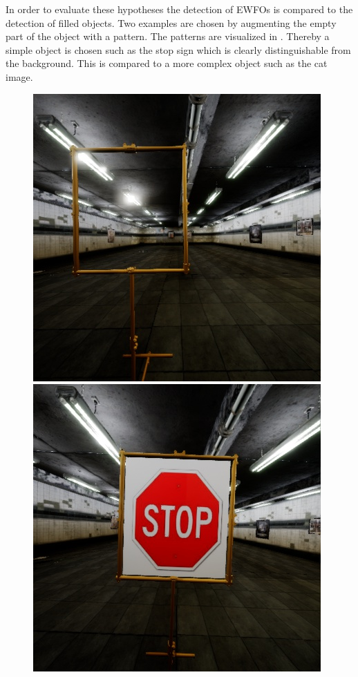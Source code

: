 In order to evaluate these hypotheses the detection of \acp{EWFO} is compared to the detection of filled objects. Two examples are chosen by augmenting the empty part of the object with a pattern. The patterns are visualized in . Thereby a simple object is chosen such as the stop sign which is clearly distinguishable from the background. This is compared to a more complex object such as the cat image.

\begin{figure}[hbtp]
	\centering
	\begin{minipage}{0.3\textwidth}
		\includegraphics[width=\textwidth]{fig/gate}
	\end{minipage}
	\begin{minipage}{0.3\textwidth}
		\includegraphics[width=\textwidth]{fig/sign}

\end{minipage}
\end{figure}
